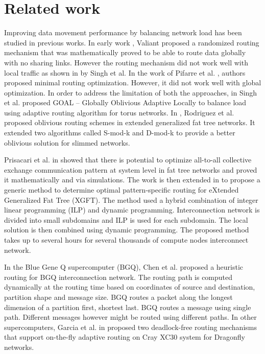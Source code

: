 \section{Related work}
\label{sec:relatedwork}

Improving data movement performance by balancing network load has been studied in previous works. In early work \cite{Valiant81:Routing}, Valiant proposed a randomized routing mechanism that was mathematically proved to be able to route data globally with no sharing links. However the routing mechanism did not work well with local traffic as shown in \cite{singh2003:GOAL} by Singh et al. In the work of Pifarre et al. \cite{Pifarre91}, authors proposed minimal routing optimization. However, it did not work well with global optimization. In order to address the limitation of both the approaches, in \cite{singh2003:GOAL} Singh et al. proposed GOAL -- Globally Oblivious Adaptive Locally to balance load using adaptive routing algorithm for torus networks. In \cite{Rodriguez09}, Rodriguez et al. proposed oblivious routing schemes in extended generalized fat tree networks. It extended two algorithms called S-mod-k and D-mod-k to provide a better oblivious solution for slimmed networks. 

Prisacari et al. in \cite{Prisacari13a} showed that there is potential to optimize all-to-all collective exchange communication pattern at system level in fat tree networks and proved it mathematically and via simulations. The work is then extended in \cite{Prisacari13b} to propose a generic method to determine optimal pattern-specific routing for eXtended Generalized Fat Tree (XGFT). The method used a hybrid combination of integer linear programming (ILP) and dynamic programming. Interconnection network is divided into small subdomains and ILP is used for each subdomain. The local solution is then combined using dynamic programming. The proposed method takes up to several hours for several thousands of compute nodes interconnect network.

In the Blue Gene Q supercomputer (BGQ), Chen et al. \cite{Chen:BGQ} proposed a heuristic routing for BGQ interconnection network. The routing path is computed dynamically at the routing time based on coordinates of source and destination, partition shape and message size. BGQ routes a packet along the longest dimension of a partition first, shortest last. BGQ routes a message using single path. Different messages however might be routed using different paths. In other supercomputers, Garcia et al. in \cite{garcia2013:CrayDragonfly} proposed two deadlock-free routing mechanisms that support on-the-fly adaptive routing on Cray XC30 system for Dragonfly networks.

